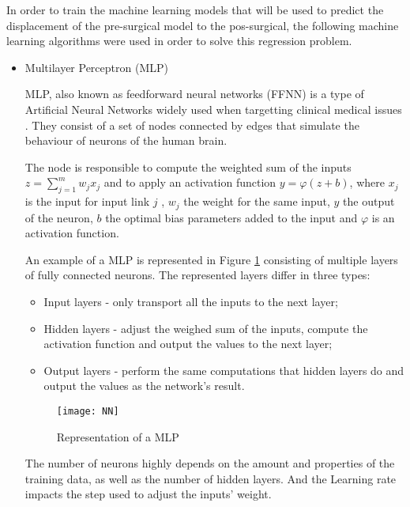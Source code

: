 In order to train the machine learning models that will be used to predict the displacement of the pre-surgical model to the pos-surgical, the following machine learning algorithms were used in order to solve this regression problem. 

\begin{itemize}
\item Multilayer Perceptron (MLP)

MLP, also known as feedforward neural networks (FFNN) is a type of Artificial Neural Networks widely used when targetting clinical medical issues \cite{Finne2000}. They consist of a set of nodes connected by edges that simulate the behaviour of neurons of the human brain. \cite{Nygren2016}

The node is responsible to compute the weighted sum of the inputs  $ z = \sum_{j=1}^{m} w_j x_j $ and to apply an activation function $ y = \varphi (z+b) $, where $x_j$ is the input for input link $j$ , $w_j$ the weight for the same input, $y$ the output of the neuron, $b$ the optimal bias parameters added to the input and $\varphi$ is an activation function.

An example of a MLP is represented in Figure \ref{fig:NN} consisting of multiple layers of fully connected neurons. The represented layers differ in three types:
\begin{itemize}
\item Input layers - only transport all the inputs to the next layer; 
\item Hidden layers - adjust the weighed sum of the inputs, compute the activation function and output the values to the next layer;
\item Output layers - perform the same computations that hidden layers do and output the values as the network's result.
\end{itemize}

\begin{figure}[!h]
\begin{center}
    \leavevmode
    \texttt{[image: NN]}
    \caption[Representation of a MLP]{Representation of a MLP \cite{Ortiz2016}}
    \label{fig:NN}
  \end{center}
\end{figure}

The number of neurons highly depends on the amount and properties of the training data, as well as the number of hidden layers. And the Learning rate impacts the step used to adjust the inputs' weight.


\end{itemize}
